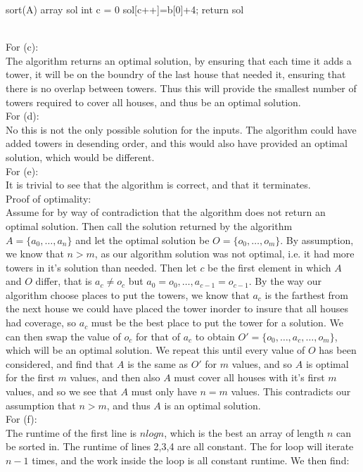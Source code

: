 \documentclass{assignment}
\begin{document}
\begin{problemlist}
\begin{answer}
\begin{algorithm}
  sort(A)\;
  array sol\;
  int c = 0\;
  sol[c++]=b[0]+4;
  return sol\;
\end{algorithm}
\\For (c):\\
The algorithm returns an optimal solution, by ensuring that each time it adds a tower, it will be on the boundry of the last house that needed it, ensuring that there is no overlap between towers. Thus this will provide the smallest number of towers required to cover all houses, and thus be an optimal solution.\\
For (d):\\
No this is not the only possible solution for the inputs. The algorithm could have added towers in desending order, and this would also have provided an optimal solution, which would be different.\\
For (e):\\
It is trivial to see that the algorithm is correct, and that it terminates.\\
Proof of optimality:\\
Assume for by way of contradiction that the algorithm does not return an optimal solution. Then call the solution returned by the algorithm $A=\{a_0,\ldots,a_n\}$ and let the optimal solution be $O=\{o_0,\ldots,o_m\}$. By assumption, we know that $n>m$, as our algorithm solution was not optimal, i.e. it had more towers in it's solution than needed. Then let $c$ be the first element in which $A$ and $O$ differ, that is $a_c \neq o_c$ but $a_0=o_0,\ldots,a_{c-1}=o_{c-1}$. By the way our algorithm choose places to put the towers, we know that $a_c$ is the farthest from the next house we could have placed the tower inorder to insure that all houses had coverage, so $a_c$ must be the best place to put the tower for a solution. We can then swap the value of $o_c$ for that of $a_c$ to obtain $O'=\{o_0,\ldots,a_c,\ldots,o_m\}$, which will be an optimal solution. We repeat this until every value of $O$ has been considered, and find that $A$ is the same as $O'$ for $m$ values, and so $A$ is optimal for the first $m$ values, and then also $A$ must cover all houses with it's first $m$ values, and so we see that $A$ must only have $n=m$ values. This contradicts our assumption that $n>m$, and thus $A$ is an optimal solution.\\
For (f):\\
The runtime of the first line is $nlogn$, which is the best an array of length $n$ can be sorted in. The runtime of lines 2,3,4 are all constant. The for loop will iterate $n-1$ times, and the work inside the loop is all constant runtime. We then find:

\end{answer}
\end{problemlist}
\end{document}

